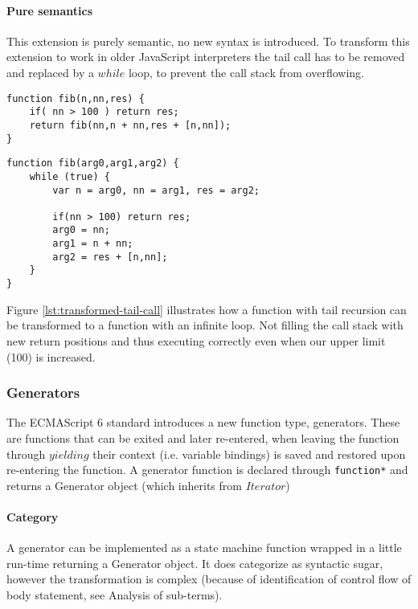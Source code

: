 \paragraph{Pure semantics}
This extension is purely semantic, no new syntax is introduced. To transform this extension to work in older JavaScript interpreters the tail call has to be removed and replaced by a $while$ loop, to prevent the call stack from overflowing.

\begin{lstlisting}[caption={Function with tail recursion},label={lst:tail-call}]
function fib(n,nn,res) {
	if( nn > 100 ) return res;
	return fib(nn,n + nn,res + [n,nn]);
}
\end{lstlisting}

\begin{lstlisting}[caption={Semantically identical function, without tail recursion},label={lst:transformed-tail-call}]
function fib(arg0,arg1,arg2) {
	while (true) {
		var n = arg0, nn = arg1, res = arg2;

		if(nn > 100) return res;
		arg0 = nn;
		arg1 = n + nn;
		arg2 = res + [n,nn];
	}
}
\end{lstlisting}

Figure \ref{lst:transformed-tail-call} illustrates how a function with tail recursion can be transformed to a function with an infinite loop. Not filling the call stack with new return positions and thus executing correctly even when our upper limit (100) is increased.

\subsubsection{Generators}
The ECMAScript 6 standard introduces a new function type, generators\cite[14.4]{SpecJS}. These are functions that can be exited and later re-entered, when leaving the function through $yielding$ their context (i.e. variable bindings) is saved and restored upon re-entering the function. A generator function is declared through \lstinline$function*$ and returns a Generator object (which inherits from $Iterator$)

\paragraph{Category}
A generator can be implemented as a state machine function wrapped in a little run-time returning a Generator object. It does categorize as syntactic sugar, however the transformation is complex (because of identification of control flow of body statement, see Analysis of sub-terms). 

